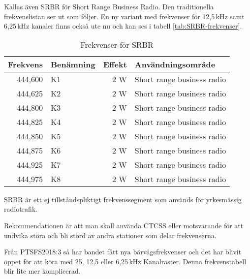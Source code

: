 Kallas även SRBR för Short Range Business Radio.  Den traditionella
frekvenslistan ser ut som följer. En ny variant med frekvenser för
12,5\,kHz samt 6,25\,kHz kanaler finns också ute nu och kan ses i
tabell \ref{tab:SRBR-frekvenser}.

\begin{table}[h]
	\centering
\begin{tabular}{rlrl}
	\textbf{Frekvens} & \textbf{Benämning} & \textbf{Effekt} & \textbf{Användningsområde} \\ \hline
	          444,600 & K1                 &             2 W & Short range business radio \\
	          444,625 & K2                 &             2 W & Short range business radio \\
	          444,800 & K3                 &             2 W & Short range business radio \\
	          444,825 & K4                 &             2 W & Short range business radio \\
	          444,850 & K5                 &             2 W & Short range business radio \\
	          444,875 & K6                 &             2 W & Short range business radio \\
	          444,925 & K7                 &             2 W & Short range business radio \\
	          444,975 & K8                 &             2 W & Short range business radio
\end{tabular}
\caption{Frekvenser för SRBR}
\end{table}

SRBR är ett ej tillståndspliktigt frekvenssegment som används för
yrkesmässig radiotrafik.

Rekommendationen är att man skall använda CTCSS eller motsvarande för
att undvika störa och bli störd av andra stationer som delar
frekvenserna.

Från PTSFS2018:3 så har bandet fått nya bärvågsfrekvenser och det har
blivit öppet för att köra med 25, 12,5 eller 6,25\,kHz
Kanalraster. Denna frekvenstabell blir lite mer komplicerad.

